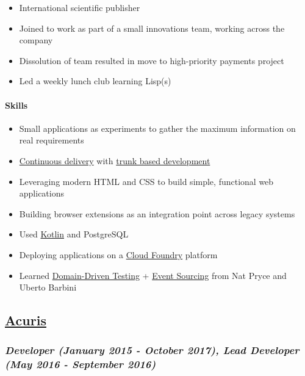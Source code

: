 \begin{itemize}
\tightlist
\item
  International scientific publisher
\item
  Joined to work as part of a small innovations team, working across the
  company
\item
  Dissolution of team resulted in move to high-priority payments project
\item
  Led a weekly lunch club learning Lisp(s)
\end{itemize}

\hypertarget{skills}{%
\paragraph{Skills}\label{skills}}

\begin{itemize}
\tightlist
\item
  Small applications as experiments to gather the maximum information on
  real requirements
\item
  \href{https://continuousdelivery.com/}{Continuous delivery} with
  \href{https://trunkbaseddevelopment.com/}{trunk based development}
\item
  Leveraging modern HTML and CSS to build simple, functional web
  applications
\item
  Building browser extensions as an integration point across legacy
  systems
\item
  Used \href{https://kotlinlang.org/}{Kotlin} and PostgreSQL
\item
  Deploying applications on a \href{https://www.cloudfoundry.org/}{Cloud
  Foundry} platform
\item
  Learned
  \href{http://www.natpryce.com/articles/000819.html}{Domain-Driven
  Testing} +
  \href{https://martinfowler.com/eaaDev/EventSourcing.html}{Event
  Sourcing} from Nat Pryce and Uberto Barbini
\end{itemize}

\hypertarget{acuris-1}{%
\subsection{\texorpdfstring{\href{http://www.acuris.com/}{Acuris}}{Acuris}}\label{acuris-1}}

\hypertarget{developer-january-2015---october-2017-lead-developer-may-2016---september-2016}{%
\subsubsection{\texorpdfstring{\emph{Developer (January 2015 - October
2017), Lead Developer (May 2016 - September
2016)}}{Developer (January 2015 - October 2017), Lead Developer (May 2016 - September 2016)}}\label{developer-january-2015---october-2017-lead-developer-may-2016---september-2016}}

